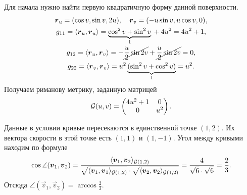\begin{solution}
	Для начала нужно найти первую квадратичную форму данной поверхности.
	\begin{gather*}
		\vec{r}_u = (\cos v, \sin v, 2u),\quad \vec{r}_v = (-u\sin v, u\cos v, 0),\\
		g_{11} = \langle\vec{r}_u, \vec{r}_u\rangle = \underbrace{\cos^2v + \sin^2v}_{1} {} + 4u^2 = 4u^2 + 1,\\
		g_{12} = \langle\vec{r}_u, \vec{r}_v\rangle = -\cancel{\frac{u}{2}\sin2v} + \cancel{\frac{u}{2}\sin2v} = 0,\\
		g_{22} = \langle\vec{r}_v, \vec{r}_v\rangle = u^2\underbrace{(\sin^2v + \cos^2v)}_{1} = u^2.
	\end{gather*}
	Получаем риманову метрику, заданную матрицей
	\[
		\G(u, v) =
		\begin{pmatrix}
			4u^2 + 1 & 0\\
			0 & u^2
		\end{pmatrix}.
	\]

	Данные в условии кривые пересекаются в единственной точке $(1, 2)$. Их вектора скорости в этой точке есть $(1, 1)$ и $(1, -1)$. Угол между кривыми находим по формуле
	\[
		\cos\angle(\vec{v}_1, \vec{v}_2) = \frac{\langle\vec{v}_1, \vec{v}_2\rangle_{\G(1, 2)}}{\sqrt{\langle\vec{v}_1, \vec{v}_1\rangle_{\G(1, 2)}} \cdot \sqrt{\langle\vec{v}_2, \vec{v}_2\rangle_{\G(1, 2)}}} = \frac{4}{\sqrt{6} \cdot \sqrt{6}} = \frac{2}{3}.
	\]
	Отсюда $\angle(\vec{v}_1, \vec{v}_2) = \arccos\frac{2}{3}$.
\end{solution}



